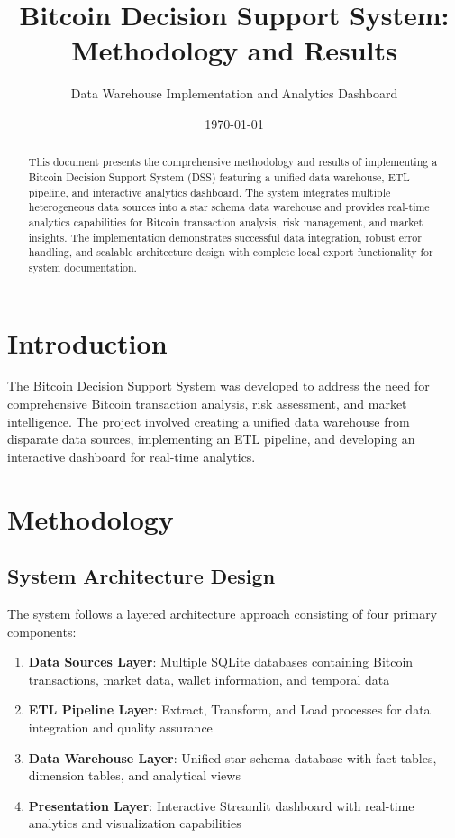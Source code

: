 \documentclass[12pt,a4paper]{article}
\title{Bitcoin Decision Support System: Methodology and Results}
\author{Data Warehouse Implementation and Analytics Dashboard}
\date{\today}
\begin{document}
\maketitle

\begin{abstract}
This document presents the comprehensive methodology and results of implementing a Bitcoin Decision Support System (DSS) featuring a unified data warehouse, ETL pipeline, and interactive analytics dashboard. The system integrates multiple heterogeneous data sources into a star schema data warehouse and provides real-time analytics capabilities for Bitcoin transaction analysis, risk management, and market insights. The implementation demonstrates successful data integration, robust error handling, and scalable architecture design with complete local export functionality for system documentation.
\end{abstract}

\section{Introduction}

The Bitcoin Decision Support System was developed to address the need for comprehensive Bitcoin transaction analysis, risk assessment, and market intelligence. The project involved creating a unified data warehouse from disparate data sources, implementing an ETL pipeline, and developing an interactive dashboard for real-time analytics.

\section{Methodology}

\subsection{System Architecture Design}

The system follows a layered architecture approach consisting of four primary components:

\begin{enumerate}
    \item \textbf{Data Sources Layer}: Multiple SQLite databases containing Bitcoin transactions, market data, wallet information, and temporal data
    \item \textbf{ETL Pipeline Layer}: Extract, Transform, and Load processes for data integration and quality assurance
    \item \textbf{Data Warehouse Layer}: Unified star schema database with fact tables, dimension tables, and analytical views
    \item \textbf{Presentation Layer}: Interactive Streamlit dashboard with real-time analytics and visualization capabilities
\end{enumerate}
\end{document}
